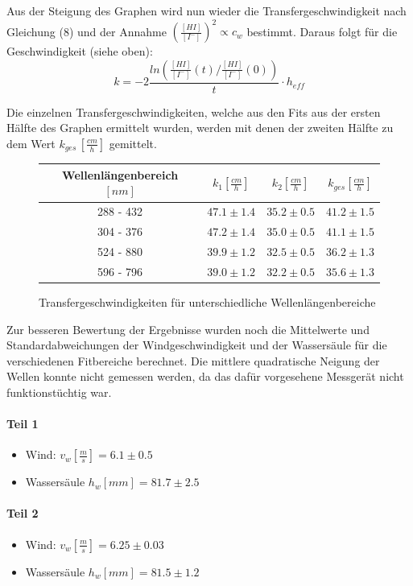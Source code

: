 \documentclass[12pt]{article}
\begin{document}
Aus der Steigung des Graphen wird nun wieder die Transfergeschwindigkeit nach Gleichung (8) und der Annahme $(\frac{[HI]}{[I^-]})^2 \propto c_w $ bestimmt.
Daraus folgt für die Geschwindigkeit (siehe oben):
\begin{equation}
k = -2 \frac{ln(\frac{[HI]}{[I^-]}(t)/\frac{[HI]}{[I^-]}(0))}{t} \cdot h_{eff}
\end{equation}

Die einzelnen Transfergeschwindigkeiten, welche aus den Fits aus der ersten Hälfte des Graphen ermittelt wurden, werden mit denen der zweiten Hälfte zu dem Wert $k_{ges} \, [\frac{cm}{h}]$ gemittelt. 

\begin{figure}[H]
	\centering
	\begin{tabular}{c|c|c|c}	
		Wellenlängenbereich $[nm]$ & $k_1 [\frac{cm}{h}]$ & $k_2 [\frac{cm}{h}]$ & $k_{ges} [\frac{cm}{h}] $ \\ \hline
		288 - 432 & $47.1 \pm 1.4$ & $35.2 \pm 0.5$ & $41.2 \pm 1.5$ \\
		304 - 376 & $47.2 \pm 1.4$ & $35.0 \pm 0.5$ & $41.1 \pm 1.5$ \\  
		524 - 880 & $39.9 \pm 1.2$ & $32.5 \pm 0.5$ & $36.2 \pm 1.3$ \\			
    	596 - 796 & $39.0 \pm 1.2$ & $32.2 \pm 0.5$ & $35.6 \pm 1.3$
	\end{tabular}
	\caption{Transfergeschwindigkeiten für unterschiedliche Wellenlängenbereiche}
\end{figure}

Zur besseren Bewertung der Ergebnisse wurden noch die Mittelwerte und Standardabweichungen der Windgeschwindigkeit und der Wassersäule für die verschiedenen Fitbereiche berechnet. Die mittlere quadratische Neigung der Wellen konnte nicht gemessen werden, da das dafür vorgesehene Messgerät nicht funktionstüchtig war.

\paragraph{Teil 1}
\begin{itemize}
	\item Wind: $v_w [\frac{m}{s}] = 6.1 \pm 0.5 $
	\item Wassersäule $h_w[mm] = 81.7 \pm 2.5 $
\end{itemize}
\paragraph{Teil 2}
\begin{itemize}
	\item Wind: $v_w [\frac{m}{s}] = 6.25 \pm 0.03 $
	\item Wassersäule $h_w[mm] = 81.5 \pm 1.2 $
\end{itemize}
\end{document}
